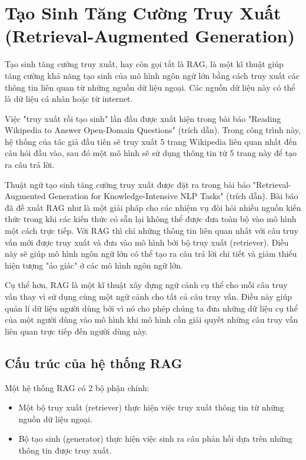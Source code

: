 \section{Tạo Sinh Tăng Cường Truy Xuất (Retrieval-Augmented Generation)}

Tạo sinh tăng cường truy xuất, hay còn gọi tắt là RAG, là một kĩ thuật giúp tăng cường khả năng tạo sinh của mô hình ngôn ngữ lớn bằng cách truy xuất các thông tin liên quan từ những nguồn dữ liệu ngoại. Các nguồn dữ liệu này có thể là dữ liệu cá nhân hoặc từ internet.

Việc "truy xuất rồi tạo sinh" lần đầu được xuất hiện trong bài báo "Reading Wikipedia to Answer Open-Domain Questions" (trích dẫn). Trong công trình này, hệ thống của tác giả đầu tiên sẽ truy xuất 5 trang Wikipedia liên quan nhất đến câu hỏi đầu vào, sau đó một mô hình sẽ sử dụng thông tin từ 5 trang này để tạo ra câu trả lời.

Thuật ngữ tạo sinh tăng cường truy xuất được đặt ra trong bài báo "Retrieval-Augmented Generation for Knowledge-Intensive NLP Tasks" (trích dẫn). Bài báo đã đề xuất RAG như là một giải pháp cho các nhiệm vụ đòi hỏi nhiều nguồn kiến thức trong khi các kiến thức có sẵn lại không thể được đưa toàn bộ vào mô hình một cách trực tiếp. Với RAG thì chỉ những thông tin liên quan nhất với câu truy vấn  mới được truy xuất và đưa vào mô hình bởi bộ truy xuất (retriever). Điều này sẽ giúp mô hình ngôn ngữ lớn có thể tạo ra câu trả lời chi tiết và giảm thiểu hiện tượng "ảo giác" ở các mô hình ngôn ngữ lớn.

Cụ thể hơn, RAG là một kĩ thuật xây dựng ngữ cảnh cụ thể cho mỗi câu truy vấn thay vì sử dụng cùng một ngữ cảnh cho tất cả câu truy vấn. Điều này giúp quản lí dữ liệu người dùng bởi vì nó cho phép chúng ta đưa những dữ liệu cụ thể của một người dùng vào mô hình khi mô hình cần giải quyết những câu truy vấn liên quan trực tiếp đến người dùng này.

\vspace{1em}
\subsection{Cấu trúc của hệ thống RAG}

Một hệ thống RAG có 2 bộ phận chính: 
\begin{itemize}
    \item Một bộ truy xuất (retriever) thực hiện việc truy xuất thông tin từ những nguồn dữ liệu ngoại.
    \item Bộ tạo sinh (generator) thực hiện việc sinh ra câu phản hồi dựa trên những thông tin được truy xuất.
\end{itemize}

